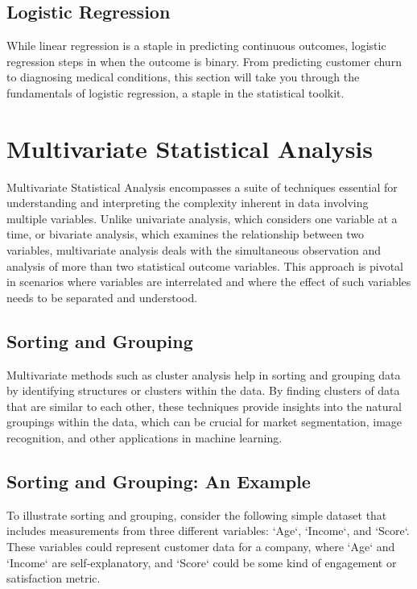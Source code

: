 \documentclass[a4paper,12pt]{book}
\begin{document}
\section{Logistic Regression}
While linear regression is a staple in predicting continuous outcomes, logistic regression steps in when the outcome is binary. From predicting customer churn to diagnosing medical conditions, this section will take you through the fundamentals of logistic regression, a staple in the statistical toolkit.

\chapter{Multivariate Statistical Analysis}
\label{chap:multivariate_statistical_analysis}

Multivariate Statistical Analysis encompasses a suite of techniques essential for understanding and interpreting the complexity inherent in data involving multiple variables. Unlike univariate analysis, which considers one variable at a time, or bivariate analysis, which examines the relationship between two variables, multivariate analysis deals with the simultaneous observation and analysis of more than two statistical outcome variables. This approach is pivotal in scenarios where variables are interrelated and where the effect of such variables needs to be separated and understood.

\section{Sorting and Grouping}
Multivariate methods such as cluster analysis help in sorting and grouping data by identifying structures or clusters within the data. By finding clusters of data that are similar to each other, these techniques provide insights into the natural groupings within the data, which can be crucial for market segmentation, image recognition, and other applications in machine learning.

\section{Sorting and Grouping: An Example}
To illustrate sorting and grouping, consider the following simple dataset that includes measurements from three different variables: `Age`, `Income`, and `Score`. These variables could represent customer data for a company, where `Age` and `Income` are self-explanatory, and `Score` could be some kind of engagement or satisfaction metric.
\end{document}
